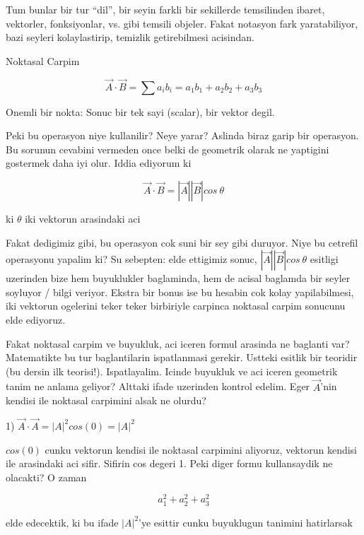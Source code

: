 \documentclass[12pt,fleqn]{article}
\begin{document}
Tum bunlar bir tur ``dil'', bir seyin farkli bir sekillerde temsilinden
ibaret, vektorler, fonksiyonlar, vs. gibi temsili objeler. Fakat notasyon
fark yaratabiliyor, bazi seyleri kolaylastirip, temizlik getirebilmesi
acisindan.

Noktasal Carpim 

\begin{equation}\label{eq1}
\vec{A} \cdot \vec{B} = \sum a_ib_i = a_1b_1 + a_2b_2 + a_3b_3 
\end{equation}

Onemli bir nokta: Sonuc bir tek sayi (scalar), bir vektor degil. 

Peki bu operasyon niye kullanilir? Neye yarar? Aslinda biraz garip bir
operasyon. Bu sorunun cevabini vermeden once belki de geometrik olarak ne
yaptigini gostermek daha iyi olur. Iddia ediyorum ki

\begin{equation}\label{eq2}
\vec{A} \cdot \vec{B} = |\vec{A}||\vec{B}|cos \ \theta 
\end{equation}

ki $\theta$ iki vektorun arasindaki aci

Fakat dedigimiz gibi, bu operasyon cok suni bir sey gibi duruyor. Niye bu
cetrefil operasyonu yapalim ki? Su sebepten: elde ettigimiz sonuc,
$|\vec{A}||\vec{B}|cos \ \theta $ esitligi uzerinden bize hem buyuklukler
baglaminda, hem de acisal baglamda bir seyler soyluyor / bilgi
veriyor. Ekstra bir bonus ise bu hesabin cok kolay yapilabilmesi, iki
vektorun ogelerini teker teker birbiriyle carpinca noktasal carpim sonucunu
elde ediyoruz. 

Fakat noktasal carpim ve buyukluk, aci iceren formul arasinda ne baglanti
var? Matematikte bu tur baglantilarin ispatlanmasi gerekir. Ustteki esitlik
bir teoridir (bu dersin ilk teorisi!). Ispatlayalim. Icinde buyukluk ve aci
iceren geometrik tanim ne anlama geliyor? Alttaki ifade uzerinden kontrol
edelim. Eger $\vec{A}$'nin kendisi ile noktasal carpimini alsak ne olurdu?

1) $\vec{A} \cdot \vec{A} = |A|^2cos(0) = |A|^2$

$cos(0)$ cunku vektorun kendisi ile noktasal carpimini aliyoruz, vektorun
kendisi ile arasindaki aci sifir. Sifirin cos degeri 1. Peki diger formu
kullansaydik ne olacakti? O zaman

\[ a_1^2 + a_2^2 + a_3^2 \]

elde edecektik, ki bu ifade $|A|^2$'ye esittir cunku buyuklugun tanimini
hatirlarsak
\end{document}
